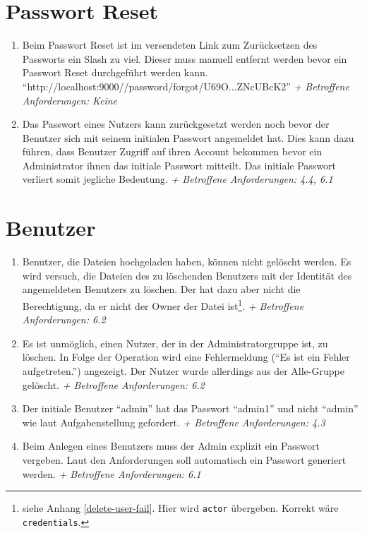 \documentclass[12pt,DIV14,BCOR10mm,a4paper,parskip=half-,headsepline,headinclude,english,ngerman,bibliography=totocnumbered]{scrreprt}
\begin{document}
\section{Passwort Reset}
\begin{enumerate}[resume]
\item Beim Passwort Reset ist im versendeten Link zum Zurücksetzen des Passworts ein Slash zu viel. Dieser muss manuell entfernt werden bevor ein Passwort Reset durchgeführt werden kann.\newline
\enquote{http://localhost:9000//password/forgot/U69O...ZNcUBcK2}\newline
\textit{+ Betroffene Anforderungen: Keine}

\item Das Passwort eines Nutzers kann zurückgesetzt werden noch bevor der Benutzer sich mit seinem initialen Passwort angemeldet hat. Dies kann dazu führen, dass Benutzer Zugriff auf ihren Account bekommen bevor ein Administrator ihnen das initiale Passwort mitteilt. Das initiale Passwort verliert somit jegliche Bedeutung.\newline
\textit{+ Betroffene Anforderungen: 4.4, 6.1}
  \end{enumerate}


\section{Benutzer}
\begin{enumerate}[resume]
\item Benutzer, die Dateien hochgeladen haben, können nicht gelöscht werden. Es wird versuch, die Dateien des zu löschenden Benutzers mit der Identität des angemeldeten Benutzers zu löschen. Der hat dazu aber nicht die Berechtigung, da er nicht der Owner der Datei ist\footnote{siehe Anhang \ref{delete-user-fail}. Hier wird \texttt{actor} übergeben. Korrekt wäre \texttt{credentials}.}.\newline
\textit{+ Betroffene Anforderungen: 6.2}

\item Es ist unmöglich, einen Nutzer, der in der Administratorgruppe ist, zu löschen. In Folge der Operation wird eine Fehlermeldung (\enquote{Es ist ein Fehler aufgetreten.}) angezeigt. Der Nutzer wurde allerdings aus der Alle-Gruppe gelöscht.\newline
\textit{+ Betroffene Anforderungen: 6.2}


\item Der initiale Benutzer \enquote{admin} hat das Passwort \enquote{admin1} und nicht \enquote{admin} wie laut Aufgabenstellung gefordert.\newline
\textit{+ Betroffene Anforderungen: 4.3}


\item Beim Anlegen eines Benutzers muss der Admin explizit ein Passwort vergeben. Laut den Anforderungen soll automatisch ein Passwort generiert werden.\newline
\textit{+ Betroffene Anforderungen: 6.1}
 \end{enumerate}
\end{document}
